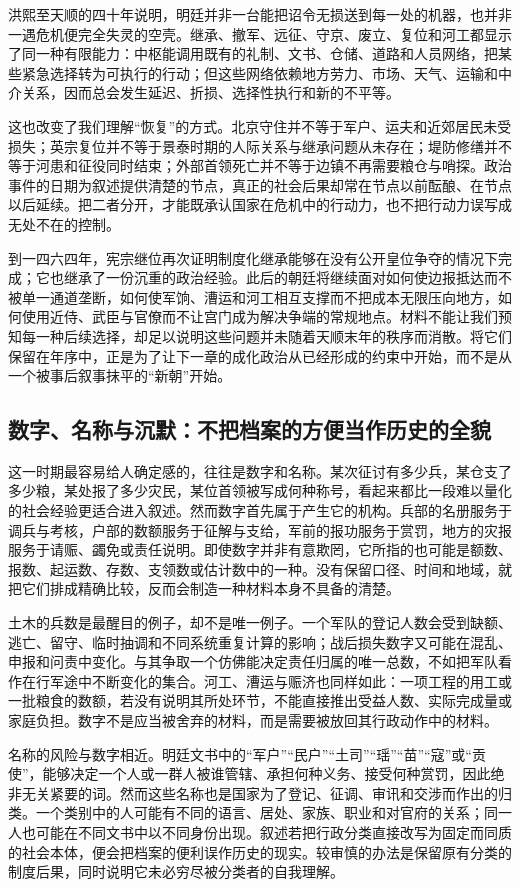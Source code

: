 洪熙至天顺的四十年说明，明廷并非一台能把诏令无损送到每一处的机器，也并非一遇危机便完全失灵的空壳。继承、撤军、远征、守京、废立、复位和河工都显示了同一种有限能力：中枢能调用既有的礼制、文书、仓储、道路和人员网络，把某些紧急选择转为可执行的行动；但这些网络依赖地方劳力、市场、天气、运输和中介关系，因而总会发生延迟、折损、选择性执行和新的不平等。

这也改变了我们理解“恢复”的方式。北京守住并不等于军户、运夫和近郊居民未受损失；英宗复位并不等于景泰时期的人际关系与继承问题从未存在；堤防修缮并不等于河患和征役同时结束；外部首领死亡并不等于边镇不再需要粮仓与哨探。政治事件的日期为叙述提供清楚的节点，真正的社会后果却常在节点以前酝酿、在节点以后延续。把二者分开，才能既承认国家在危机中的行动力，也不把行动力误写成无处不在的控制。

到一四六四年，宪宗继位再次证明制度化继承能够在没有公开皇位争夺的情况下完成；它也继承了一份沉重的政治经验。此后的朝廷将继续面对如何使边报抵达而不被单一通道垄断，如何使军饷、漕运和河工相互支撑而不把成本无限压向地方，如何使用近侍、武臣与官僚而不让宫门成为解决争端的常规地点。材料不能让我们预知每一种后续选择，却足以说明这些问题并未随着天顺末年的秩序而消散。将它们保留在年序中，正是为了让下一章的成化政治从已经形成的约束中开始，而不是从一个被事后叙事抹平的“新朝”开始。

\subsection{数字、名称与沉默：不把档案的方便当作历史的全貌}

这一时期最容易给人确定感的，往往是数字和名称。某次征讨有多少兵，某仓支了多少粮，某处报了多少灾民，某位首领被写成何种称号，看起来都比一段难以量化的社会经验更适合进入叙述。然而数字首先属于产生它的机构。兵部的名册服务于调兵与考核，户部的数额服务于征解与支给，军前的报功服务于赏罚，地方的灾报服务于请赈、蠲免或责任说明。即使数字并非有意欺罔，它所指的也可能是额数、报数、起运数、存数、支领数或估计数中的一种。没有保留口径、时间和地域，就把它们排成精确比较，反而会制造一种材料本身不具备的清楚。

土木的兵数是最醒目的例子，却不是唯一例子。一个军队的登记人数会受到缺额、逃亡、留守、临时抽调和不同系统重复计算的影响；战后损失数字又可能在混乱、申报和问责中变化。与其争取一个仿佛能决定责任归属的唯一总数，不如把军队看作在行军途中不断变化的集合。河工、漕运与赈济也同样如此：一项工程的用工或一批粮食的数额，若没有说明其所处环节，不能直接推出受益人数、实际完成量或家庭负担。数字不是应当被舍弃的材料，而是需要被放回其行政动作中的材料。

名称的风险与数字相近。明廷文书中的“军户”“民户”“土司”“瑶”“苗”“寇”或“贡使”，能够决定一个人或一群人被谁管辖、承担何种义务、接受何种赏罚，因此绝非无关紧要的词。然而这些名称也是国家为了登记、征调、审讯和交涉而作出的归类。一个类别中的人可能有不同的语言、居处、家族、职业和对官府的关系；同一人也可能在不同文书中以不同身份出现。叙述若把行政分类直接改写为固定而同质的社会本体，便会把档案的便利误作历史的现实。较审慎的办法是保留原有分类的制度后果，同时说明它未必穷尽被分类者的自我理解。

